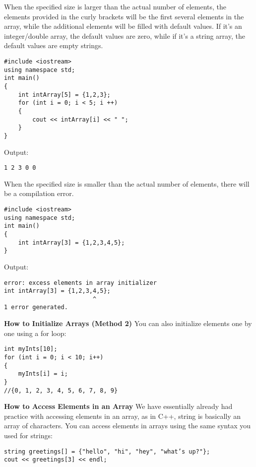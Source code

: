 \begin{example}
    When the specified size is larger than the actual number of elements, the elements provided in the curly brackets will be the first several elements in the array, while the additional elements will be filled with default values. If it’s an integer/double array, the default values are zero, while if it’s a string array, the default values are empty strings.
    \begin{verbatim}
#include <iostream>
using namespace std;
int main()
{
    int intArray[5] = {1,2,3};
    for (int i = 0; i < 5; i ++)
    {
        cout << intArray[i] << " ";
    }
}
    \end{verbatim}

    Output:

    \texttt{1 2 3 0 0}
\end{example}

\begin{example}
    When the specified size is smaller than the actual number of elements, there will be a compilation error.

    \begin{verbatim}
#include <iostream>
using namespace std;
int main()
{
    int intArray[3] = {1,2,3,4,5};
}
    \end{verbatim}

    Output:

    \begin{verbatim}
error: excess elements in array initializer
int intArray[3] = {1,2,3,4,5};
                         ^
1 error generated.
    \end{verbatim}
\end{example}

\textbf{How to Initialize Arrays (Method 2)} You can also initialize elements one by one using a for loop:

\begin{verbatim}
int myInts[10];
for (int i = 0; i < 10; i++)
{
    myInts[i] = i;
}
//{0, 1, 2, 3, 4, 5, 6, 7, 8, 9}
\end{verbatim}

\textbf{How to Access Elements in an Array} We have essentially already had practice with accessing elements in an array, as in C++, string is basically an array of characters. You can access elements in arrays using the same syntax you used for strings:

\begin{verbatim}
string greetings[] = {"hello", "hi", "hey", "what’s up?"};
cout << greetings[3] << endl;
\end{verbatim}

